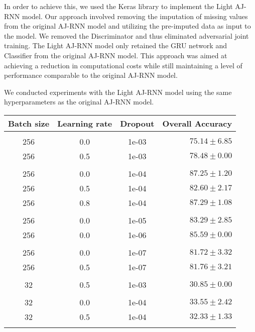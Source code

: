 In order to achieve this, we used the Keras library to implement the Light AJ-RNN model.
Our approach involved removing the imputation of missing values from the original AJ-RNN model and utilizing the pre-imputed data as input to the model.
We removed the Discriminator and thus eliminated adversarial joint training.
The Light AJ-RNN model only retained the GRU network and Classifier from the original AJ-RNN model.
This approach was aimed at achieving a reduction in computational costs while still maintaining a level of performance comparable to the original AJ-RNN model.

We conducted experiments with the Light AJ-RNN model using the same hyperparameters as the original AJ-RNN model.


\begin{table}[!htbp]
  \centering
  \begin{tabular}{cccr} 
      Batch size & Learning rate & Dropout & Overall Accuracy\\[0.2cm] 
      \hline \\[-0.2cm]
      256 & 0.0 & 1e-03 & $75.14 \pm 6.85$\\
      256 & 0.5 & 1e-03 & $78.48 \pm 0.00$\\[0.05cm] \hline \\[-0.25cm]

      256 & 0.0 & 1e-04 & $87.25 \pm 1.20$\\
      256 & 0.5 & 1e-04 & $82.60 \pm 2.17$\\
      256 & 0.8 & 1e-04 & $87.29 \pm 1.08$\\[0.05cm] \hline \\[-0.25cm]

      256 & 0.0 & 1e-05 & $83.29 \pm 2.85$\\
      256 & 0.0 & 1e-06 & $85.59 \pm 0.00$\\[0.05cm] \hline \\[-0.25cm]

      256 & 0.0 & 1e-07 & $81.72 \pm 3.32$\\
      256 & 0.5 & 1e-07 & $81.76 \pm 3.21$\\[0.05cm] \hline \\[-0.25cm]

      32  & 0.5 & 1e-03 & $30.85 \pm 0.00$\\[0.05cm] \hline \\[-0.25cm]

      32  & 0.0 & 1e-04 & $33.55 \pm 2.42$\\
      32  & 0.5 & 1e-04 & $32.33 \pm 1.33$\\[0.05cm] \hline \\[-0.25cm]


\end{tabular}
\end{table}
